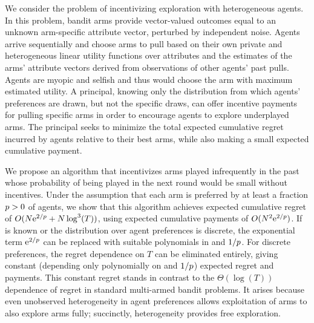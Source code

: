 We consider the problem of incentivizing exploration with heterogeneous agents.
In this problem, bandit arms provide vector-valued outcomes equal to an unknown
arm-specific attribute vector,
perturbed by independent noise.
Agents arrive sequentially and choose arms to pull based on their own
private and heterogeneous linear utility functions over attributes
and the estimates of the arms' attribute vectors derived from
observations of other agents' past pulls.
Agents are myopic and selfish and thus would choose the arm with
maximum estimated utility.
A principal, knowing only the distribution from which agents'
preferences are drawn, but not the specific draws,
can offer incentive payments for pulling specific arms
in order to encourage agents to explore underplayed arms.
The principal seeks to minimize the total expected cumulative regret
incurred by agents relative to their best arms,
while also making a small expected cumulative payment.

We propose an algorithm that incentivizes arms played infrequently in the
past whose probability of being played in the next round would be small
without incentives.
Under the assumption that each arm is preferred by at
least a fraction $p > 0$ of agents,
we show that this algorithm achieves expected
cumulative regret of $O (N \mathrm{e}^{2/p} + N \log^3(T))$,
using expected cumulative payments of $O(N^2 \mathrm{e}^{2/p})$.
If \MinProb is known or the distribution over agent
preferences is discrete,
the exponential term $\mathrm{e}^{2/p}$ can be replaced with suitable
polynomials in \ARMNUM and $1/p$.
For discrete preferences, the regret dependence on $T$ can be
eliminated entirely, giving constant (depending only polynomially on
\ARMNUM and $1/p$) expected regret and payments.
This constant regret stands in contrast to the $\Theta(\log(T))$ dependence of
regret in standard multi-armed bandit problems.
It arises because even unobserved heterogeneity in agent preferences
allows exploitation of arms to also explore arms fully;
succinctly, heterogeneity provides free exploration.

